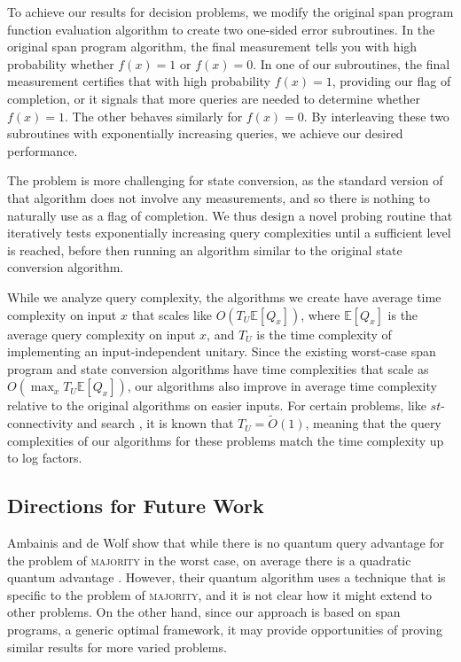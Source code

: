 \documentclass[cleveref, autoref, thm-restate,11pt]{article}
\theoremstyle{definition}
\begin{document}
To achieve our results for decision problems, we modify the original span program function
evaluation algorithm to create two one-sided error subroutines. In the
original span program algorithm, the final measurement tells you with high
probability whether $f(x)=1$ or $f(x)=0.$ In one of our subroutines, the final
measurement certifies that with high probability $f(x)=1$, providing our flag
of completion, or it signals that more queries are needed to determine
whether $f(x)=1$. The other behaves similarly for $f(x)=0$. By interleaving
these two subroutines with exponentially increasing queries, we achieve our
desired performance.

The problem is more challenging for state conversion, as the standard version
of that algorithm does not involve any measurements, and so there is nothing
to naturally use as a flag of completion. We thus design a novel probing
routine that iteratively tests exponentially increasing query complexities
until a sufficient level is reached, before then running an algorithm similar
to the original state conversion algorithm.

While we analyze query complexity, the algorithms we create have average time
complexity on input $x$ that scales like $O(T_U\mathbb{E}[Q_x])$, where $\mathbb{E}[Q_x]$ is the average query
complexity on input $x$, and $T_U$ is the time complexity of implementing an
input-independent unitary. Since the existing worst-case span program and
state conversion algorithms have time complexities that scale as $O
(\max_x T_U \mathbb{E}[Q_x])$, our algorithms also improve in average time complexity
relative to the original algorithms on easier inputs. For certain problems, like
$st$-connectivity \cite{10.1007/978-3-642-33090-2_18} and search 
\cite{cornelissen2020span}, it is known that $T_U=\tilde{O}(1)$, meaning that the
query complexities of our algorithms for these problems match the time
complexity up to log factors.





\subsection{Directions for Future Work}

Ambainis and de Wolf show that while there is no
quantum query advantage for the problem of \textsc{majority} in the worst case, on 
average there is a quadratic quantum advantage \cite{ambainis2001average}. However, 
their quantum algorithm uses a technique that is specific to the problem of 
\textsc{majority}, and it is not clear how it might extend to other problems. On
 the other hand, since our approach is based on span programs, a generic optimal 
 framework, it may
provide opportunities of proving similar results for more varied problems.
\end{document}
